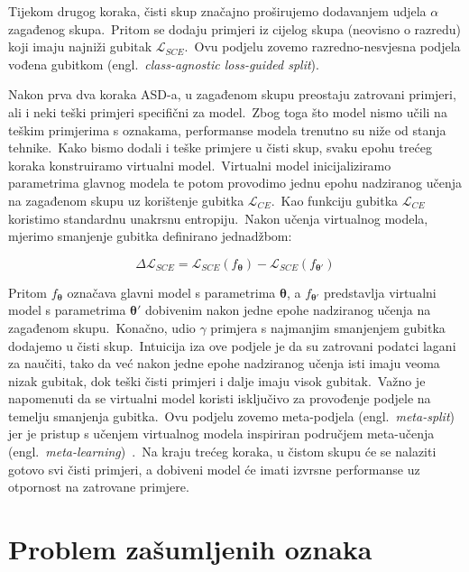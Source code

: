 \documentclass[diplomskirad]{fer}
\begin{document}
Tijekom drugog koraka, čisti skup značajno proširujemo dodavanjem udjela $\alpha$ zagađenog skupa.\ 
Pritom se dodaju primjeri iz cijelog skupa (neovisno o razredu) koji imaju najniži gubitak $\mathcal{L}_{SCE}$.\ 
Ovu podjelu zovemo razredno-nesvjesna podjela vođena gubitkom (engl.\ \textit{class-agnostic loss-guided split}).\ 
  
Nakon prva dva koraka ASD-a, u zagađenom skupu preostaju zatrovani primjeri, ali i neki teški primjeri specifični za model.\ 
Zbog toga što model nismo učili na teškim primjerima s oznakama, performanse modela trenutno su niže od stanja tehnike.\ Kako bismo dodali i teške primjere u čisti skup, svaku epohu trećeg koraka konstruiramo virtualni model.\ 
Virtualni model inicijaliziramo parametrima glavnog modela te potom provodimo jednu epohu nadziranog učenja na zagađenom skupu uz korištenje gubitka $\mathcal{L}_{CE}$.\ Kao funkciju gubitka $\mathcal{L}_{CE}$ koristimo standardnu unakrsnu entropiju.\ 
Nakon učenja virtualnog modela, mjerimo smanjenje gubitka definirano jednadžbom:

\begin{equation}
  \Delta \mathcal{L}_{SCE} = \mathcal{L}_{SCE}(f_{\bm{\theta}}) - \mathcal{L}_{SCE}(f_{\bm{\theta'}})
  \label{eq:asd}
\end{equation}

Pritom $f_{\bm{\theta}}$ označava glavni model s parametrima $\bm{\theta}$, a $f_{\bm{\theta'}}$ predstavlja virtualni model s parametrima $\bm{\theta'}$ dobivenim nakon jedne epohe nadziranog učenja na zagađenom skupu.\ 
Konačno, udio $\gamma$ primjera s najmanjim smanjenjem gubitka dodajemo u čisti skup.\ Intuicija iza ove podjele je da su zatrovani podatci lagani za naučiti, tako da već nakon jedne epohe nadziranog učenja isti imaju veoma nizak gubitak, dok teški čisti primjeri i dalje imaju visok gubitak.\ 
Važno je napomenuti da se virtualni model koristi isključivo za provođenje podjele na temelju smanjenja gubitka.\ 
Ovu podjelu zovemo meta-podjela (engl.\ \textit{meta-split}) jer je pristup s učenjem virtualnog modela inspiriran područjem meta-učenja (engl.\ \textit{meta-learning})~\cite{vilalta2002perspective}.\
Na kraju trećeg koraka, u čistom skupu će se nalaziti gotovo svi čisti primjeri, a dobiveni model će imati izvrsne performanse uz otpornost na zatrovane primjere.\

\chapter{Problem zašumljenih oznaka}
\label{pog:zasumljeni}
\end{document}
